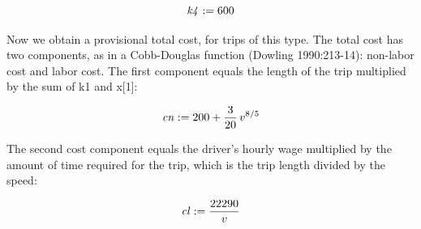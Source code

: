 \documentclass{article}
\begin{document}
\begin{maplegroup}
\begin{mapleinput}
\end{mapleinput}

\mapleresult
\begin{maplelatex}
\[
{\it k4} := 600
\]
\end{maplelatex}

\end{maplegroup}
\begin{maplegroup}
Now we obtain a provisional total cost, for trips of this type. The
total cost has two components, as in a Cobb-Douglas function (Dowling
1990:213-14): non-labor cost and labor cost. The first component
equals the length of the trip multiplied by the sum of k1 and x[1]:

\begin{mapleinput}
\end{mapleinput}

\mapleresult
\begin{maplelatex}
\[
{\it cn} := 200 + {\displaystyle \frac {3}{20}} \,v^{8/5}
\]
\end{maplelatex}

\end{maplegroup}
\begin{maplegroup}
\begin{mapleinput}
\end{mapleinput}

\end{maplegroup}
\begin{maplegroup}
The second cost component equals the driver's hourly wage multiplied
by the amount of time required for the trip, which is the trip length
divided by the speed:

\begin{mapleinput}
\end{mapleinput}

\mapleresult
\begin{maplelatex}
\[
{\it cl} := {\displaystyle \frac {22290}{v}}
\]
\end{maplelatex}

\end{maplegroup}
\end{document}
